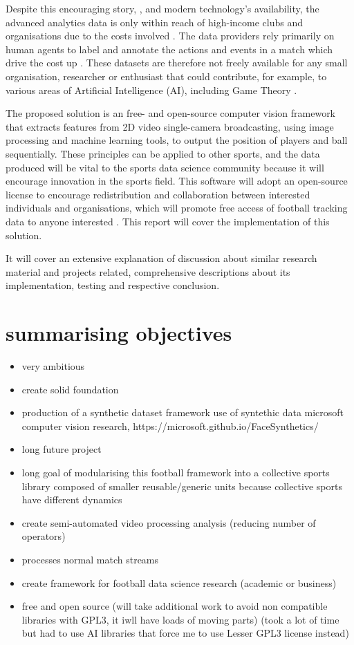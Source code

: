 \documentclass[
11pt,
twoside
]{report}
\begin{document}
Despite this encouraging story, \cite{liverpool}, and modern technology's availability, the advanced analytics data is only within reach of high-income clubs and organisations due to the costs involved \cite{opta}. The data providers rely primarily on human agents to label and annotate the actions and events in a match which drive the cost up \cite{opta}. These datasets are therefore not freely available for any small organisation, researcher or enthusiast that could contribute, for example, to various areas of Artificial Intelligence (AI), including Game Theory \cite{deepmind}.


The proposed solution is an free- and open-source computer vision framework that extracts features from 2D video single-camera broadcasting, using image processing and machine learning tools, to output the position of players and ball sequentially. These principles can be applied to other sports, and the data produced will be vital to the sports data science community because it will encourage innovation in the sports field. This software will adopt an open-source license to encourage redistribution and collaboration between interested individuals and organisations, which will promote free access of football tracking data to anyone interested \cite{osd}.  This report will cover the implementation of this solution.


It will cover an extensive explanation of  discussion about similar research material and projects related, comprehensive descriptions about its implementation, testing and respective conclusion.



\section{summarising objectives}


\begin{itemize}
\item
  very ambitious
\item
  create solid foundation
\item
    production of a synthetic dataset framework
    use of syntethic data
  microsoft computer vision research,
  https://microsoft.github.io/FaceSynthetics/
\item
  long future project
\item
  long goal of modularising this football framework into a collective
  sports library composed of smaller reusable/generic units because
  collective sports have different dynamics
\item
  create semi-automated video processing analysis (reducing number of
  operators)
\item
  processes normal match streams
\item
  create framework for football data science research (academic or
  business)
\item
  free and open source (will take additional work to avoid non
  compatible libraries with GPL3, it iwll have loads of moving parts)
  (took a lot of time but had to use AI libraries that force me to use
  Lesser GPL3 license instead)
\end{itemize}
\end{document}
